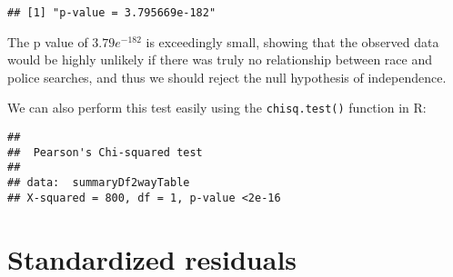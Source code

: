 \documentclass[]{book}
\newenvironment{Shaded}{\begin{snugshade}}{\end{snugshade}}
\newcommand{\KeywordTok}[1]{\textcolor[rgb]{0.13,0.29,0.53}{\textbf{#1}}}
\newcommand{\DataTypeTok}[1]{\textcolor[rgb]{0.13,0.29,0.53}{#1}}
\newcommand{\DecValTok}[1]{\textcolor[rgb]{0.00,0.00,0.81}{#1}}
\newcommand{\StringTok}[1]{\textcolor[rgb]{0.31,0.60,0.02}{#1}}
\newcommand{\CommentTok}[1]{\textcolor[rgb]{0.56,0.35,0.01}{\textit{#1}}}
\newcommand{\OtherTok}[1]{\textcolor[rgb]{0.56,0.35,0.01}{#1}}
\newcommand{\OperatorTok}[1]{\textcolor[rgb]{0.81,0.36,0.00}{\textbf{#1}}}
\newcommand{\NormalTok}[1]{#1}
\theoremstyle{definition}
\theoremstyle{definition}
\theoremstyle{definition}
\theoremstyle{remark}
\begin{document}
\begin{Shaded}
\end{Shaded}

\begin{verbatim}
## [1] "p-value = 3.795669e-182"
\end{verbatim}

The p value of \(3.79e^{-182}\) is exceedingly small, showing that the
observed data would be highly unlikely if there was truly no
relationship between race and police searches, and thus we should reject
the null hypothesis of independence.

We can also perform this test easily using the \texttt{chisq.test()}
function in R:

\begin{Shaded}
\end{Shaded}

\begin{verbatim}
## 
##  Pearson's Chi-squared test
## 
## data:  summaryDf2wayTable
## X-squared = 800, df = 1, p-value <2e-16
\end{verbatim}

\section{Standardized residuals}\label{standardized-residuals}
\end{document}
